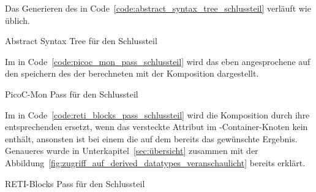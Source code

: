 Das Generieren des  in Code~\ref{code:abstract_syntax_tree_schlussteil} verläuft wie üblich.

\begin{code}
  \centering
  \caption{Abstract Syntax Tree für den Schlussteil}
  \label{code:abstract_syntax_tree_schlussteil}
\end{code}

Im  in Code~\ref{code:picoc_mon_pass_schlussteil} wird das eben angesprochene auf den  speichern des  der berechneten  mit der Komposition  dargestellt.

\begin{code}
  \centering
  \caption{PicoC-Mon Pass für den Schlussteil}
  \label{code:picoc_mon_pass_schlussteil}
\end{code}

Im  in Code~\ref{code:reti_blocks_pass_schlussteil} wird die Komposition  durch ihre entsprechenden  ersetzt, wenn das \textcolor{gray!90!black}{versteckte Attribut}  im -Container-Knoten kein   enthält, ansonsten ist bei einem  die  auf dem  bereits das gewünschte Ergebnis. Genaueres wurde in Unterkapitel~\ref{sec:übersicht} zusammen mit der Abbildung~\ref{fig:zugriff_auf_derived_datatypes_veranschaulicht} bereits erklärt.

\begin{code}
  \centering
  \caption{RETI-Blocks Pass für den Schlussteil}
  \label{code:reti_blocks_pass_schlussteil}
\end{code}

